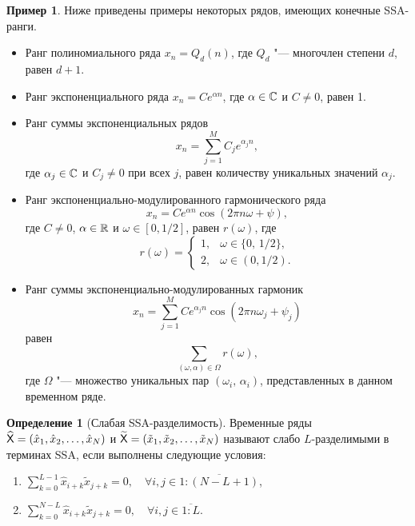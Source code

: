 \documentclass[specialist,
  substylefile=spbu.rtx,
subf,href,colorlinks=true, 12pt]{disser}
\theoremstyle{plain}
\theoremstyle{definition}
\newtheorem{definition}{Определение}[section]
\newtheorem{example}{Пример}[section]
\theoremstyle{remark}
\begin{document}
\begin{example}
  \label{ex:ssa-ranks}
  Ниже приведены примеры некоторых рядов, имеющих конечные SSA-ранги.
  \begin{itemize}
    \item Ранг полиномиального ряда $x_n = Q_d(n)$, где $Q_d$ "--- многочлен степени $d$, равен $d + 1$.
    \item Ранг экспоненциального ряда $x_n = C e^{\alpha n}$, где $\alpha \in \mathbb{C}$ и $C \ne 0$, равен 1.
    \item Ранг суммы экспоненциальных рядов
      \[
        x_n = \sum_{j=1}^{M} C_j e^{\alpha_j n},
      \]
      где $\alpha_j \in \mathbb{C}$ и $C_j \ne 0$ при всех $j$, равен количеству уникальных
      значений $\alpha_j$.
    \item Ранг экспоненциально-модулированного гармонического ряда
      \[
        x_n = C e^{\alpha n}\cos(2 \pi n \omega + \psi),
      \]
      где $C \ne 0$, $\alpha \in \mathbb{R}$ и $\omega \in [0,1/2]$,
      равен $r(\omega)$, где
      \begin{equation}
        \label{eq:cos-rank}
        r(\omega) =
        \begin{cases}
          1, & \omega \in \{0,\, 1/2\},\\
          2, & \omega \in (0, 1/2).
        \end{cases}
      \end{equation}
    \item Ранг суммы экспоненциально-модулированных гармоник
      \[
        x_n = \sum_{j=1}^{M} C e^{\alpha_j n}\cos(2 \pi n \omega_j + \psi_j)
      \]
      равен
      \begin{equation*}
        \label{eq:cos-sum-rank}
        \sum_{(\omega, \alpha)\in \Omega} r(\omega),
      \end{equation*}
      где $\Omega$ "--- множество уникальных пар $(\omega_i,\, \alpha_i)$, представленных в данном временном ряде.
  \end{itemize}
\end{example}

\begin{definition}[Слабая SSA-разделимость]
  \label{def:ssa-separability}
  Временные ряды $\widehat{\mathsf{X}} = (\hat{x}_1, \hat{x}_2, \ldots, \hat{x}_N)$ и
  $\widetilde{\mathsf{X}} = (\tilde{x}_1, \tilde{x}_2, \ldots, \tilde{x}_N)$ называют слабо $L$-разделимыми в терминах
  SSA, если выполнены следующие условия:
  \begin{enumerate}
    \item $\displaystyle \sum_{k=0}^{L - 1} \hat{x}_{i + k}\tilde{x}_{j + k} = 0,
      \quad \forall i, j \in \overline{1:(N - L + 1)}$,
    \item $\displaystyle \sum_{k=0}^{N - L} \hat{x}_{i + k}\tilde{x}_{j + k} = 0,
      \quad \forall i, j \in \overline{1:L}$.
  \end{enumerate}
\end{definition}
\end{document}
